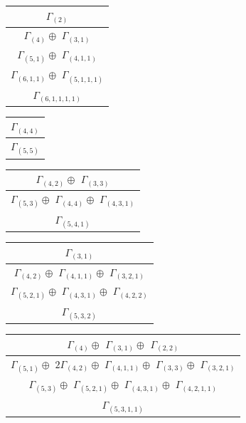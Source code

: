 \documentclass[main.tex]{subfiles}
\begin{document}
\begin{minipage}{.3\textwidth}
\centering
\begin{tabular}{c}
$\Gamma_{(
2
)}$
\\ \hline
$\Gamma_{(
4
)} \oplus$
$\Gamma_{(
3 , 
1
)}$
\\ \hline
$\Gamma_{(
5 , 
1
)} \oplus$
$\Gamma_{(
4 , 
1 , 
1
)}$
\\ \hline
$\Gamma_{(
6 , 
1 , 
1
)} \oplus$
$\Gamma_{(
5 , 
1 , 
1 , 
1
)}$
\\ \hline
$\Gamma_{(
6 , 
1 , 
1 , 
1 , 
1
)}$
\\
\end{tabular}\end{minipage}
\bigskip
\begin{minipage}{.2\textwidth}
\centering
\begin{tabular}{c}
$\Gamma_{(
4 , 
4
)}$
\\ \hline
$\Gamma_{(
5 , 
5
)}$
\\
\end{tabular}\end{minipage}
\begin{minipage}{.4\textwidth}
\centering
\begin{tabular}{c}
$\Gamma_{(
4 , 
2
)} \oplus$
$\Gamma_{(
3 , 
3
)}$
\\ \hline
$\Gamma_{(
5 , 
3
)} \oplus$
$\Gamma_{(
4 , 
4
)} \oplus$
$\Gamma_{(
4 , 
3 , 
1
)}$
\\ \hline
$\Gamma_{(
5 , 
4 , 
1
)}$
\\
\end{tabular}\end{minipage}
\begin{minipage}{.4\textwidth}
\centering
\begin{tabular}{c}
$\Gamma_{(
3 , 
1
)}$
\\ \hline
$\Gamma_{(
4 , 
2
)} \oplus$
$\Gamma_{(
4 , 
1 , 
1
)} \oplus$
$\Gamma_{(
3 , 
2 , 
1
)}$
\\ \hline
$\Gamma_{(
5 , 
2 , 
1
)} \oplus$
$\Gamma_{(
4 , 
3 , 
1
)} \oplus$
$\Gamma_{(
4 , 
2 , 
2
)}$
\\ \hline
$\Gamma_{(
5 , 
3 , 
2
)}$
\\
\end{tabular}\end{minipage}
\bigskip
\begin{minipage}{.5\textwidth}
\centering
\begin{tabular}{c}
$\Gamma_{(
4
)} \oplus$
$\Gamma_{(
3 , 
1
)} \oplus$
$\Gamma_{(
2 , 
2
)}$
\\ \hline
$\Gamma_{(
5 , 
1
)} \oplus$
$2\Gamma_{(
4 , 
2
)} \oplus$
$\Gamma_{(
4 , 
1 , 
1
)} \oplus$
$\Gamma_{(
3 , 
3
)} \oplus$
$\Gamma_{(
3 , 
2 , 
1
)}$
\\ \hline
$\Gamma_{(
5 , 
3
)} \oplus$
$\Gamma_{(
5 , 
2 , 
1
)} \oplus$
$\Gamma_{(
4 , 
3 , 
1
)} \oplus$
$\Gamma_{(
4 , 
2 , 
1 , 
1
)}$
\\ \hline
$\Gamma_{(
5 , 
3 , 
1 , 
1
)}$
\\
\end{tabular}\end{minipage}
\end{document}
